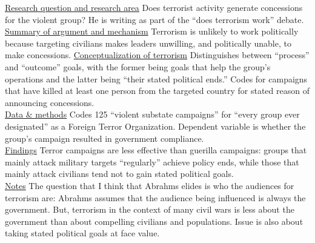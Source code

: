 \documentclass{article}[12pt]
\begin{document}
\underline{Research question and research area} Does terrorist activity generate concessions for the violent group? He is writing as part of the ``does terrorism work'' debate. \\
\underline{Summary of argument and mechanism} Terrorism is unlikely to work politically because targeting civilians makes leaders unwilling, and politically unable, to make concessions.
\underline{Conceptualization of terrorism} Distinguishes between ``process'' and ``outcome'' goals, with the former being goals that help the group's operations and the latter being ``their stated political ends.'' Codes for campaigns that have killed at least one person from the targeted country for stated reason of announcing concessions. \\
\underline{Data \& methods} Codes 125 ``violent substate campaigns'' for ``every group ever designated'' as a Foreign Terror Organization. Dependent variable is whether the group's campaign resulted in government compliance.   \\
\underline{Findings} Terror campaigns are less effective than guerilla campaigns: groups that mainly attack military targets ``regularly'' achieve policy ends, while those that mainly attack civilians tend not to gain stated political goals.  \\
\underline{Notes} The question that I think that Abrahms elides is who the audiences for terrorism are: Abrahms assumes that the audience being influenced is always the government. But, terrorism in the context of many civil wars is less about the government than about compelling civilians and populations.  Issue is also about taking stated political goals at face value. \\
\end{document}
